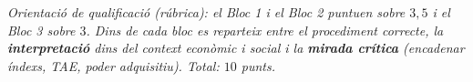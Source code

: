 \noindent\small\textit{Orientació de qualificació (rúbrica): el Bloc 1 i el Bloc 2
puntuen sobre $3,5$ i el Bloc 3 sobre $3$. Dins de cada bloc es reparteix entre el
procediment correcte, la \textbf{interpretació} dins del context econòmic i social i la
\textbf{mirada crítica} (encadenar índexs, TAE, poder adquisitiu). Total: $10$ punts.}
